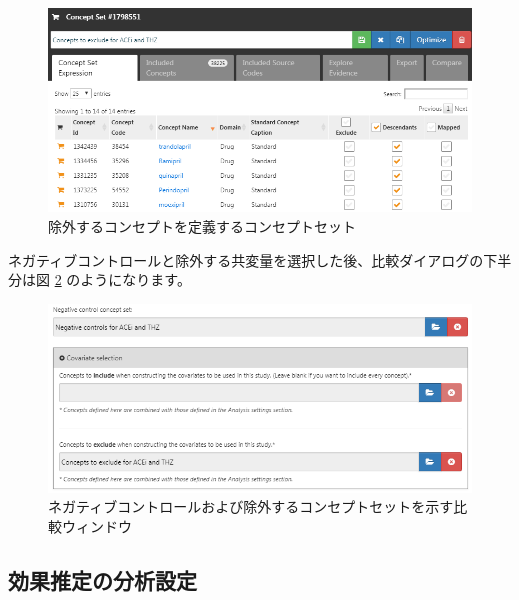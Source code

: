 \documentclass[
  11pt]{book}
\theoremstyle{definition}
\theoremstyle{definition}
\theoremstyle{definition}
\theoremstyle{definition}
\theoremstyle{remark}
\begin{document}
\begin{figure}

{\centering \includegraphics[width=1\linewidth]{images/PopulationLevelEstimation/covsToExclude} 

}

\caption{除外するコンセプトを定義するコンセプトセット}\label{fig:covsToExclude}
\end{figure}

ネガティブコントロールと除外する共変量を選択した後、比較ダイアログの下半分は図 \ref{fig:comparisons2} のようになります。

\begin{figure}

{\centering \includegraphics[width=1\linewidth]{images/PopulationLevelEstimation/comparisons2} 

}

\caption{ネガティブコントロールおよび除外するコンセプトセットを示す比較ウィンドウ}\label{fig:comparisons2}
\end{figure}

\subsection{効果推定の分析設定}\label{ux52b9ux679cux63a8ux5b9aux306eux5206ux6790ux8a2dux5b9a}
\end{document}
